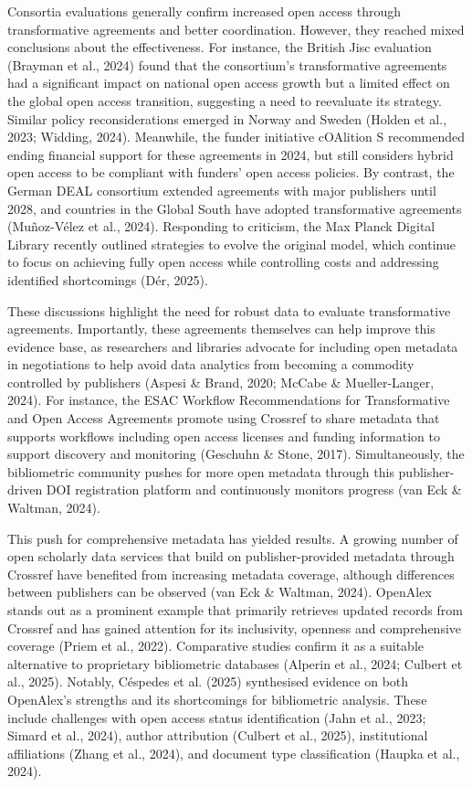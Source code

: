 \documentclass[a4paper,man,floatsintext,longtable,noextraspace,10pt]{apa6}
\begin{document}
Consortia evaluations generally confirm increased open access through
transformative agreements and better coordination. However, they reached
mixed conclusions about the effectiveness. For instance, the British
Jisc evaluation (Brayman et al., 2024) found that the consortium's
transformative agreements had a significant impact on national open
access growth but a limited effect on the global open access transition,
suggesting a need to reevaluate its strategy. Similar policy
reconsiderations emerged in Norway and Sweden (Holden et al., 2023;
Widding, 2024). Meanwhile, the funder initiative cOAlition S recommended
ending financial support for these agreements in 2024, but still
considers hybrid open access to be compliant with funders' open access
policies. By contrast, the German DEAL consortium extended agreements
with major publishers until 2028, and countries in the Global South have
adopted transformative agreements (Muñoz-Vélez et al., 2024). Responding
to criticism, the Max Planck Digital Library recently outlined
strategies to evolve the original model, which continue to focus on
achieving fully open access while controlling costs and addressing
identified shortcomings (Dér, 2025).

These discussions highlight the need for robust data to evaluate
transformative agreements. Importantly, these agreements themselves can
help improve this evidence base, as researchers and libraries advocate
for including open metadata in negotiations to help avoid data analytics
from becoming a commodity controlled by publishers (Aspesi \& Brand,
2020; McCabe \& Mueller-Langer, 2024). For instance, the ESAC Workflow
Recommendations for Transformative and Open Access Agreements promote
using Crossref to share metadata that supports workflows including open
access licenses and funding information to support discovery and
monitoring (Geschuhn \& Stone, 2017). Simultaneously, the bibliometric
community pushes for more open metadata through this publisher-driven
DOI registration platform and continuously monitors progress (van Eck \&
Waltman, 2024).

This push for comprehensive metadata has yielded results. A growing
number of open scholarly data services that build on publisher-provided
metadata through Crossref have benefited from increasing metadata
coverage, although differences between publishers can be observed (van
Eck \& Waltman, 2024). OpenAlex stands out as a prominent example that
primarily retrieves updated records from Crossref and has gained
attention for its inclusivity, openness and comprehensive coverage
(Priem et al., 2022). Comparative studies confirm it as a suitable
alternative to proprietary bibliometric databases (Alperin et al., 2024;
Culbert et al., 2025). Notably, Céspedes et al. (2025) synthesised
evidence on both OpenAlex's strengths and its shortcomings for
bibliometric analysis. These include challenges with open access status
identification (Jahn et al., 2023; Simard et al., 2024), author
attribution (Culbert et al., 2025), institutional affiliations (Zhang et
al., 2024), and document type classification (Haupka et al., 2024).
\end{document}
